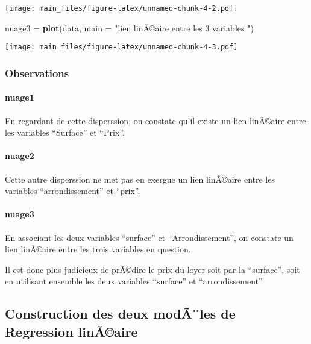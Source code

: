 \documentclass[]{article}
\newenvironment{Shaded}{\begin{snugshade}}{\end{snugshade}}
\newcommand{\KeywordTok}[1]{\textcolor[rgb]{0.13,0.29,0.53}{\textbf{#1}}}
\newcommand{\DataTypeTok}[1]{\textcolor[rgb]{0.13,0.29,0.53}{#1}}
\newcommand{\StringTok}[1]{\textcolor[rgb]{0.31,0.60,0.02}{#1}}
\newcommand{\NormalTok}[1]{#1}
\let\oldparagraph\paragraph
\renewcommand{\paragraph}[1]{\oldparagraph{#1}\mbox{}}
\begin{document}
\texttt{[image: main\_files/figure-latex/unnamed-chunk-4-2.pdf]}

\begin{Shaded}
\begin{Highlighting}[]
\NormalTok{nuage3 =}\StringTok{ }\KeywordTok{plot}\NormalTok{(data, }\DataTypeTok{main =} \StringTok{"lien linÃ©aire entre les 3 variables "}\NormalTok{)}
\end{Highlighting}
\end{Shaded}

\texttt{[image: main\_files/figure-latex/unnamed-chunk-4-3.pdf]}

\subsubsection{Observations}\label{observations}

\paragraph{nuage1}\label{nuage1}

En regardant de cette disperssion, on constate qu'il existe un lien
linÃ©aire entre les variables ``Surface'' et ``Prix''.

\paragraph{nuage2}\label{nuage2}

Cette autre disperssion ne met pas en exergue un lien linÃ©aire entre
les variables ``arrondissement'' et ``prix''.

\paragraph{nuage3}\label{nuage3}

En associant les deux variables ``surface'' et ``Arrondissement'', on
constate un lien linÃ©aire entre les trois variables en question.

Il est donc plus judicieux de prÃ©dire le prix du loyer soit par la
``surface'', soit en utilisant ensemble les deux variables ``surface''
et ``arrondissement''

\subsection{Construction des deux modÃ¨les de Regression
linÃ©aire}\label{construction-des-deux-modales-de-regression-linaaire}
\end{document}
